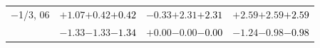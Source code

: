 \documentclass[compress]{beamer}
\begin{document}
\begin{frame}
\begin{tabular}{r | c | c | c}
$-$1/3, 06 & $+1.07$\hspace{0.1 cm}$+0.42$\hspace{0.1 cm}\textcolor{black}{$+0.42$} & $-0.33$\hspace{0.1 cm}$+2.31$\hspace{0.1 cm}\textcolor{black}{$+2.31$} & $+2.59$\hspace{0.1 cm}$+2.59$\hspace{0.1 cm}\textcolor{black}{$+2.59$} \\
           & $-1.33$\hspace{0.1 cm}$-1.33$\hspace{0.1 cm}\textcolor{black}{$-1.34$} & $+0.00$\hspace{0.1 cm}$-0.00$\hspace{0.1 cm}\textcolor{black}{$-0.00$} & $-1.24$\hspace{0.1 cm}$-0.98$\hspace{0.1 cm}\textcolor{black}{$-0.98$} \\
\end{tabular}
\end{frame}
\end{document}
